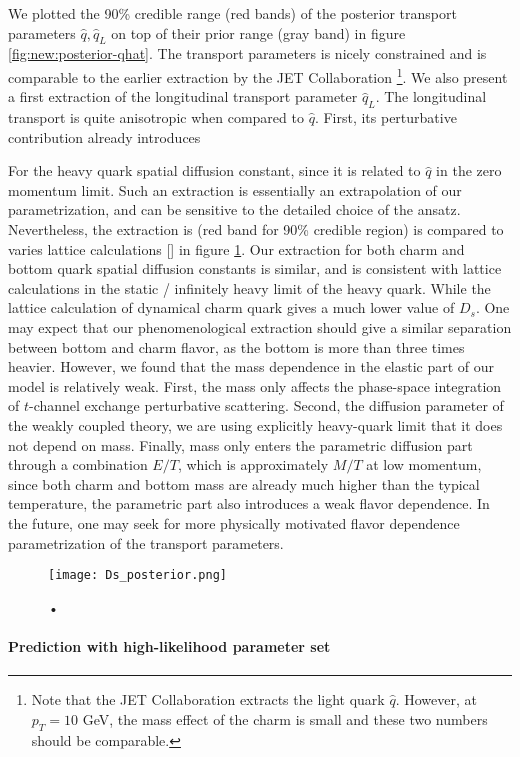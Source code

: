 We plotted the 90\% credible range (red bands) of the posterior transport parameters $\hat{q}, \hat{q}_L$ on top of their prior range (gray band) in figure \ref{fig:new:posterior-qhat}.
The transport parameters is nicely constrained and is comparable to the earlier extraction by the JET Collaboration \footnote{Note that the JET Collaboration extracts the light quark $\hat{q}$. However, at $p_T = 10$ GeV, the mass effect of the charm is small and these two numbers should be comparable.}.
We also present a first extraction of the longitudinal transport parameter $\hat{q}_L$. 
The longitudinal transport is quite anisotropic when compared to $\hat{q}$.
First, its perturbative contribution already introduces

For the heavy quark spatial diffusion constant, since it is related to $\hat{q}$ in the zero momentum limit. 
Such an extraction is essentially an extrapolation of our parametrization, and can be sensitive to the detailed choice of the ansatz.
Nevertheless, the extraction is (red band for 90\% credible region) is compared to varies lattice calculations [] in  figure \ref{fig:new:posterior-Ds}.
Our extraction for both charm and bottom quark spatial diffusion constants is similar, and is consistent with lattice calculations in the static / infinitely heavy limit of the heavy quark.
While the lattice calculation of dynamical charm quark gives a much lower value of $D_s$.
One may expect that our phenomenological extraction should give a similar separation between bottom and charm flavor, as the bottom is more than three times heavier.
However, we found that the mass dependence in the elastic part of our model is relatively weak. 
First, the mass only affects the phase-space integration of $t$-channel exchange perturbative scattering.
Second, the diffusion parameter of the weakly coupled theory, we are using explicitly heavy-quark limit that it does not depend on mass.
Finally, mass only enters the parametric diffusion part through a combination $E/T$, which is approximately $M/T$ at low momentum, since both charm and bottom mass are already much higher than the typical temperature, the parametric part also introduces a weak flavor dependence.
In the future, one may seek for more physically motivated flavor dependence parametrization of the transport parameters.

\begin{figure}
\centering
\texttt{[image: Ds\_posterior.png]}
\caption{•}
\label{fig:new:posterior-Ds}
\end{figure}

\paragraph{Prediction with high-likelihood parameter set}


